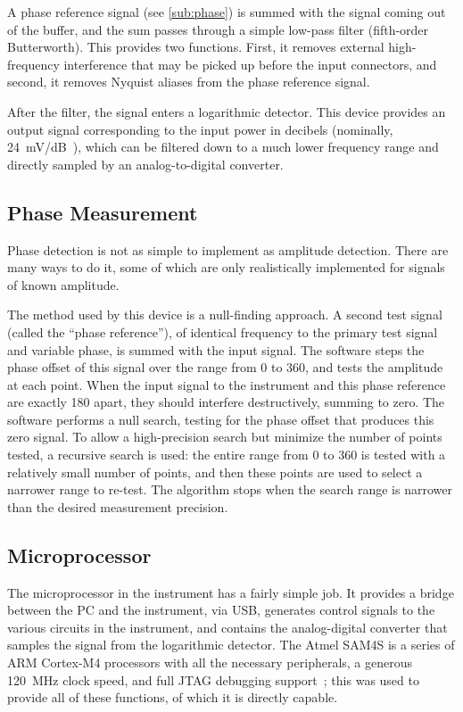 A phase reference signal (see \autoref{sub:phase}) is summed with the signal coming out
of the buffer, and the sum passes through a simple low-pass filter (fifth-order
Butterworth). This provides two functions. First, it removes external high-frequency
interference that may be picked up before the input connectors, and second, it removes
Nyquist aliases from the phase reference signal.

After the filter, the signal enters a logarithmic detector. This device provides an
output signal corresponding to the input power in decibels (nominally, 24~mV/dB~\cite{ad8310}),
which can be filtered down to a much lower frequency range and directly sampled by
an analog-to-digital converter.

\subsection{Phase Measurement}
\label{sub:phase}

Phase detection is not as simple to implement as amplitude detection. There are many
ways to do it, some of which are only realistically implemented for signals of known
amplitude.

The method used by this device is a null-finding approach. A second test signal (called
the ``phase reference''), of
identical frequency to the primary test signal and variable phase, is summed with the
input signal. The software steps the phase offset of this signal over the range from
0\dg{} to 360\dg, and tests the amplitude at each point. When the input signal to the
instrument and this phase reference are exactly 180\dg{} apart, they should interfere
destructively, summing to zero. The software performs a null search, testing for the
phase offset that produces this zero signal. To allow a high-precision search but
minimize the number of points tested, a recursive search is used: the entire range
from 0\dg{} to 360\dg{} is tested with a relatively small number of points, and then
these points are used to select a narrower range to re-test. The algorithm stops when
the search range is narrower than the desired measurement precision.

\subsection{Microprocessor}

The microprocessor in the instrument has a fairly simple job. It provides a bridge
between the PC and the instrument, via USB, generates control signals to the various
circuits in the instrument, and contains the analog-digital converter that samples the
signal from the logarithmic detector. The Atmel SAM4S is a series of ARM Cortex-M4
processors with all the necessary peripherals, a generous 120~MHz clock speed, and
full JTAG debugging support~\cite{sam4s};
this was used to provide all of these functions, of which it is
directly capable.

